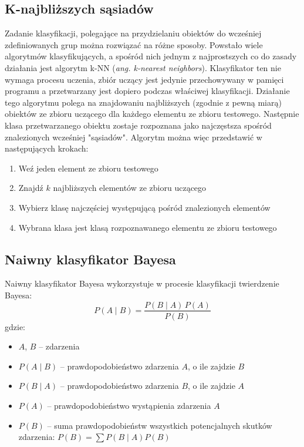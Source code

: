 \documentclass{classrep}
\begin{document}
{        \subsection{K-najbliższych sąsiadów}
        \label{knn_intro} {
            Zadanie klasyfikacji, polegające na przydzielaniu obiektów do wcześniej
            zdefiniowanych grup
            można rozwiązać na różne sposoby. Powstało wiele algorytmów
            klasyfikujących, a spośród nich
            jednym z najprostszych co do zasady działania jest algorytm
            k-NN (\emph{ang. k-nearest neighbors}).
            Klasyfikator ten nie wymaga procesu uczenia, zbiór uczący jest jedynie
            przechowywany w pamięci
            programu a przetwarzany jest dopiero podczas właściwej klasyfikacji.
            Działanie tego algorytmu polega
            na znajdowaniu najbliższych (zgodnie z pewną miarą) obiektów ze zbioru
            uczącego dla każdego elementu
            ze zbioru testowego. Następnie klasa przetwarzanego obiektu zostaje
            rozpoznana jako najczęstsza spośród
            znalezionych wcześniej "sąsiadów". Algorytm można więc przedstawić w
            następujących krokach:
            \begin{enumerate}
                \item Weź jeden element ze zbioru testowego
                \item Znajdź $k$ najbliższych elementów ze zbioru uczącego
                \item Wybierz klasę najczęściej występującą pośród znalezionych elementów
                \item Wybrana klasa jest klasą rozpoznawanego elementu ze zbioru testowego
            \end{enumerate}
        }

        \subsection{Naiwny klasyfikator Bayesa}
        \label{bayes_intro} {
            Naiwny klasyfikator Bayesa wykorzystuje w procesie klasyfikacji twierdzenie Bayesa:
            $$ P(A \mid B) = \frac{P(B \mid A) \, P(A)}{P(B)} $$
            gdzie:
            \begin{itemize}
                \item $A$, $B$ -- zdarzenia
                \item $P(A \mid B)$ -- prawdopodobieństwo zdarzenia $A$, o ile zajdzie $B$
                \item $P(B \mid A)$ -- prawdopodobieństwo zdarzenia $B$, o ile zajdzie $A$
                \item $P(A)$ -- prawdopodobieństwo wystąpienia zdarzenia $A$
                \item $P(B)$ -- suma prawdopodobieństw wszystkich potencjalnych skutków zdarzenia: $P(B)=\sum P(B\mid A)P(B)$
            \end{itemize}

}}
\end{document}

